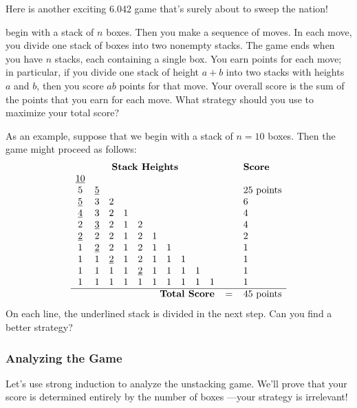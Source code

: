 Here is another exciting 6.042 game that's surely about to sweep the
nation!

 begin with a stack of $n$ boxes.  Then you
make a sequence of moves.  In each move, you divide one stack of boxes
into two nonempty stacks.  The game ends when you have $n$ stacks, each
containing a single box.  You earn points for each move; in particular, if
you divide one stack of height $a + b$ into two stacks with heights $a$
and $b$, then you score $ab$ points for that move.  Your overall score is
the sum of the points that you earn for each move.  What strategy should
you use to maximize your total score?

As an example, suppose that we begin with a stack of $n = 10$ boxes.
Then the game might proceed as follows:
%
\[
\begin{array}{cccccccccccl}
\multicolumn{10}{c}{\textbf{Stack Heights}} & \quad & \textbf{Score} \\
\underline{10}&&&&&&&&& && \\
5&\underline{5}&&&&&&&& && 25 \text{ points} \\
\underline{5}&3&2&&&&&&& && 6 \\
\underline{4}&3&2&1&&&&&& && 4 \\
2&\underline{3}&2&1&2&&&&& && 4 \\
\underline{2}&2&2&1&2&1&&&& && 2 \\
1&\underline{2}&2&1&2&1&1&&& && 1 \\
1&1&\underline{2}&1&2&1&1&1&& && 1 \\
1&1&1&1&\underline{2}&1&1&1&1& && 1 \\
1&1&1&1&1&1&1&1&1&1 && 1 \\ \hline
\multicolumn{10}{r}{\textbf{Total Score}} & = & 45 \text{ points}
\end{array}
\]
%
On each line, the underlined stack is divided in the next step.  Can
you find a better strategy?

\subsubsection{Analyzing the Game}



Let's use strong induction to analyze the unstacking game.  We'll prove
that your score is determined entirely by the number of boxes ---your
strategy is irrelevant!

